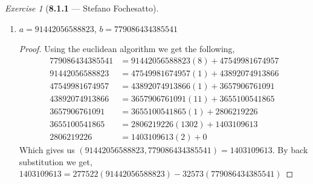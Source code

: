 \documentclass[12pt]{amsart}
\theoremstyle{remark}
\newtheorem*{exercise}{Exercise}%
\theoremstyle{mycomment}
\begin{document}
\begin{exercise}[\textbf{8.1.1} --- Stefano Fochesatto]
\begin{enumerate}
    \item[e.] $a = 91442056588823$, $b = 779086434385541$
    \begin{proof} Using the euclidean algorithm we get the following, 
      \begin{align*}
        779086434385541 &= 91442056588823(8) + 47549981674957\\
        91442056588823 &= 47549981674957(1) + 43892074913866\\
        47549981674957 &= 43892074913866(1) + 3657906761091\\
        43892074913866 &= 3657906761091(11) + 3655100541865\\
        3657906761091 &=  3655100541865(1) + 2806219226\\
        3655100541865 &= 2806219226(1302) + 1403109613\\
        2806219226 &= 1403109613(2) + 0
      \end{align*}
      Which gives us $(91442056588823,779086434385541) = 1403109613$. By back substitution we get, $1403109613 = 277522(91442056588823) - 32573(779086434385541)$
    \end{proof}

  \end{enumerate}
\end{exercise}
\vspace{.5in}
\end{document}
